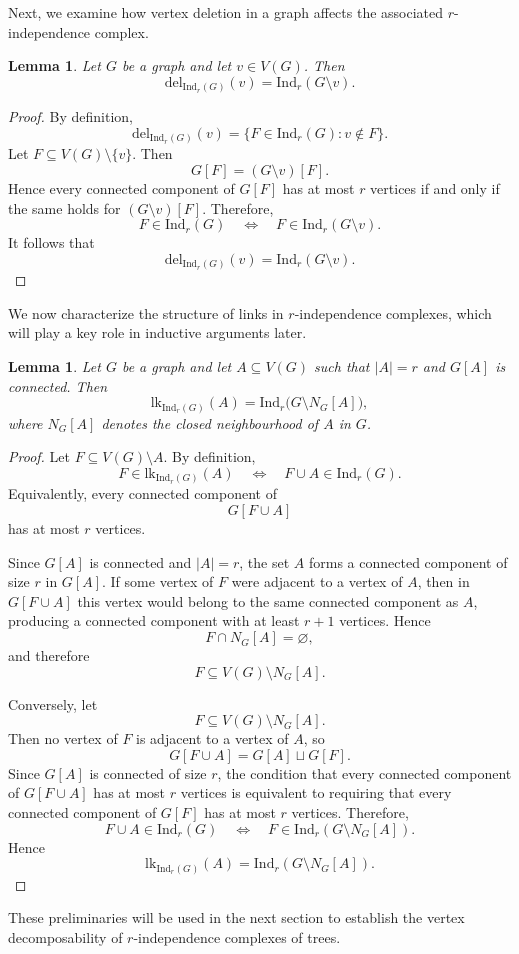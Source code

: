 \documentclass[12pt,reqno]{amsart}
\newtheorem{lemma}[theorem]{Lemma}
\theoremstyle{definition}
\def\Ind{\mathrm{Ind}}
\def\del{\mathrm{del}}
\def\lk{\mathrm{lk}}
\begin{document}
Next, we examine how vertex deletion in a graph affects the associated $r$-independence complex.


\begin{lemma}\label{lem: del}
Let $G$ be a graph and let $v \in V(G)$. Then
\[
\del_{\Ind_r(G)}(v)=\Ind_r(G\setminus v).
\]
\end{lemma}

\begin{proof}
By definition,
\[
\del_{\Ind_r(G)}(v)
=
\{F\in \Ind_r(G): v\notin F\}.
\]
Let $F \subseteq V(G)\setminus\{v\}$. Then
\[
G[F]=(G\setminus v)[F].
\]
Hence every connected component of $G[F]$ has at most $r$ vertices if and only if the same holds for $(G\setminus v)[F]$. Therefore,
\[
F\in \Ind_r(G)
\quad\Longleftrightarrow\quad
F\in \Ind_r(G\setminus v).
\]
It follows that
\[
\del_{\Ind_r(G)}(v)=\Ind_r(G\setminus v).
\]
\end{proof}

We now characterize the structure of links in $r$-independence complexes, which will play a key role in inductive arguments later.

\begin{lemma}\label{lem: link}
Let $G$ be a graph and let $A \subseteq V(G)$ such that $|A|=r$ and $G[A]$ is connected. Then
\[
\lk_{\Ind_r(G)}(A)
=
\Ind_r\bigl(G \setminus N_G[A]\bigr),
\]
where $N_G[A]$ denotes the closed neighbourhood of $A$ in $G$.
\end{lemma}

\begin{proof}
Let $F \subseteq V(G)\setminus A$. By definition,
\[
F\in \lk_{\Ind_r(G)}(A)
\quad \Longleftrightarrow \quad
F\cup A \in \Ind_r(G).
\]
Equivalently, every connected component of
\[
G[F\cup A]
\]
has at most $r$ vertices.

Since $G[A]$ is connected and $|A|=r$, the set $A$ forms a connected component of size $r$ in $G[A]$. If some vertex of $F$ were adjacent to a vertex of $A$, then in $G[F\cup A]$ this vertex would belong to the same connected component as $A$, producing a connected component with at least $r+1$ vertices. Hence
\[
F \cap N_G[A]=\varnothing,
\]
and therefore
\[
F \subseteq V(G)\setminus N_G[A].
\]

Conversely, let
\[
F \subseteq V(G)\setminus N_G[A].
\]
Then no vertex of $F$ is adjacent to a vertex of $A$, so
\[
G[F\cup A]
=
G[A]\sqcup G[F].
\]
Since $G[A]$ is connected of size $r$, the condition that every connected component of $G[F\cup A]$ has at most $r$ vertices is equivalent to requiring that every connected component of $G[F]$ has at most $r$ vertices. Therefore,
\[
F\cup A\in \Ind_r(G)
\quad\Longleftrightarrow\quad
F\in \Ind_r(G\setminus N_G[A]).
\]
Hence
\[
\lk_{\Ind_r(G)}(A)
=
\Ind_r(G\setminus N_G[A]).
\]
\end{proof}
These preliminaries will be used in the next section to establish the vertex decomposability of $r$-independence complexes of trees.
\end{document}
